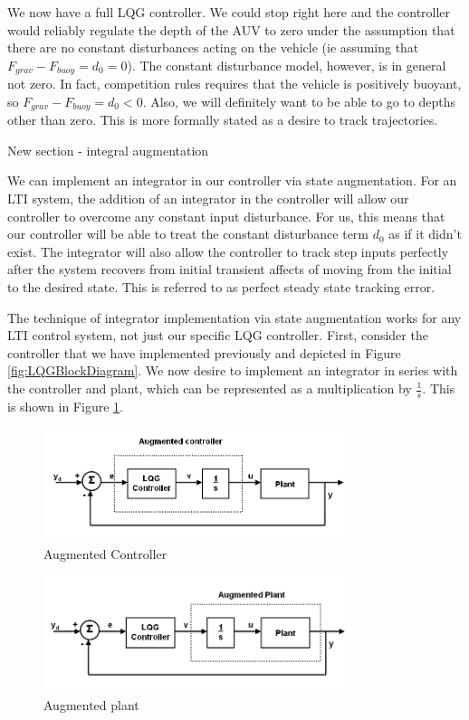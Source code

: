 \documentclass{article}
\begin{document}
We now have a full LQG controller.  We could stop right here and the controller would reliably regulate the depth of the AUV to zero under the assumption that there are no constant disturbances acting on the vehicle (ie assuming that $F_{grav}-F_{buoy}=d_0=0$).  The constant disturbance model, however, is in general not zero.  In fact, competition rules requires that the vehicle is positively buoyant, so $F_{grav}-F_{buoy}=d_0<0$.  Also, we will definitely want to be able to go to depths other than zero.  This is more formally stated as a desire to track trajectories.  

New section - integral augmentation

We can implement an integrator in our controller via state augmentation.  For an LTI system, the addition of an integrator in the controller will allow our controller to overcome any constant input disturbance.  For us, this means that our controller will be able to treat the constant disturbance term $d_0$ as if it didn't exist.  The integrator will also allow the controller to track step inputs perfectly after the system recovers from initial transient affects of moving from the initial to the desired state.  This is referred to as perfect steady state tracking error.

The technique of integrator implementation via state augmentation works for any LTI control system, not just our specific LQG controller.  First, consider the controller that we have implemented previously and depicted in Figure \ref{fig:LQGBlockDiagram}.  We now desire to implement an integrator in series with the controller and plant, which can be represented as a multiplication by $\frac{1}{s}$.  This is shown in Figure \ref{fig:LQGAugmentedController}.  

\begin{figure}[h]
\includegraphics[width=0.8\textwidth]{LQGAugmentedController.png}
\centering
\caption{Augmented Controller}
\label{fig:LQGAugmentedController}
\end{figure}

\begin{figure}[h]
\includegraphics[width=0.8\textwidth]{LQGAugmentedPlant.png}
\centering
\caption{Augmented plant}
\label{fig:LQGAugmentedPlant}
\end{figure}
\end{document}
